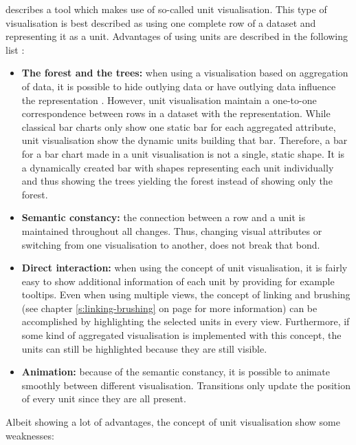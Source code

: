\citeauthor{Drucker2015} describes a tool which makes use of so-called unit visualisation. This type of visualisation is best described as using one complete row of a dataset and representing it as a unit. Advantages of using units are described in the following list :
\begin{itemize}
\item \textbf{The forest and the trees:} when using a visualisation based on aggregation of data, it is possible to hide outlying data or have outlying data influence the representation . However, unit visualisation maintain a one-to-one correspondence between rows in a dataset with the representation. While classical bar charts only show one static bar for each aggregated attribute, unit visualisation show the dynamic units building that bar. Therefore, a bar for a bar chart made in a unit visualisation is not a single, static shape. It is a dynamically created bar with shapes representing each unit individually and thus showing the trees yielding the forest instead of showing only the forest.

\item \textbf{Semantic constancy:} the connection between a row and a unit is maintained throughout all changes. Thus, changing visual attributes or switching from one visualisation to another, does not break that bond.

\item \textbf{Direct interaction:} when using the concept of unit visualisation, it is fairly easy to show additional information of each unit by providing for example tooltips. Even when using multiple views, the concept of linking and brushing (see chapter \ref{s:linking-brushing} on page \pageref{s:linking-brushing} for more information) can be accomplished by highlighting the selected units in every view. Furthermore, if some kind of aggregated visualisation is implemented with this concept, the units can still be highlighted because they are still visible.

\item \textbf{Animation:} because of the semantic constancy, it is possible to animate smoothly between different visualisation. Transitions only update the position of every unit since they are all present.

\end{itemize}

Albeit showing a lot of advantages, the concept of unit visualisation show some weaknesses:

